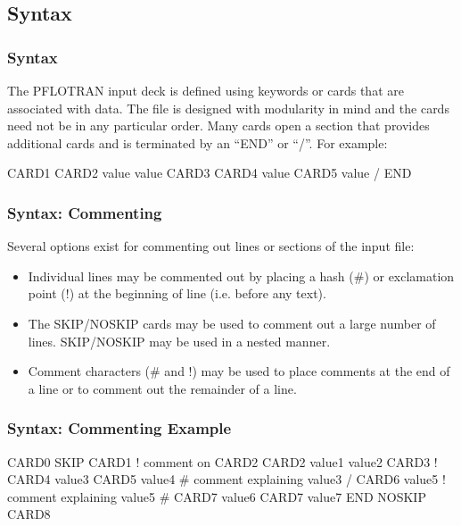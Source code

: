 \subsection{Syntax}

\begin{frame}\frametitle{Syntax}

The PFLOTRAN input deck is defined using keywords or cards that are associated with data.  The file is designed with modularity in mind and the cards need not be in any particular order.  Many cards open a section that provides additional cards and is terminated by an ``END'' or ``/''.  For example:

\begin{semiverbatim}
CARD1
  CARD2 value value
  CARD3
    CARD4 value
    CARD5 value
  /
END
\end{semiverbatim}

\end{frame}

\begin{frame}[fragile]\frametitle{Syntax: Commenting}
Several options exist for commenting out lines or sections of the input file:
\begin{itemize}
\item Individual lines may be commented out by placing a hash (\#) or exclamation point (!) at the beginning of line (i.e. before any text).
\item The SKIP/NOSKIP cards may be used to comment out a large number of lines.  SKIP/NOSKIP may be used in a nested manner.  
\item Comment characters (\# and !) may be used to place comments at the end of a line or to comment out the remainder of a line.
\end{itemize}

\end{frame}

\begin{frame}[containsverbatim]\frametitle{Syntax: Commenting Example}

\begin{semiverbatim}
CARD0
SKIP
CARD1
  ! comment on CARD2
  CARD2 value1 value2
  CARD3
  !  CARD4 value3 
    CARD5 value4 # comment explaining value3
  /
  CARD6 value5 ! comment explaining value5
#  CARD7 value6
  CARD7 value7
END
NOSKIP
CARD8
\end{semiverbatim}

\end{frame}
